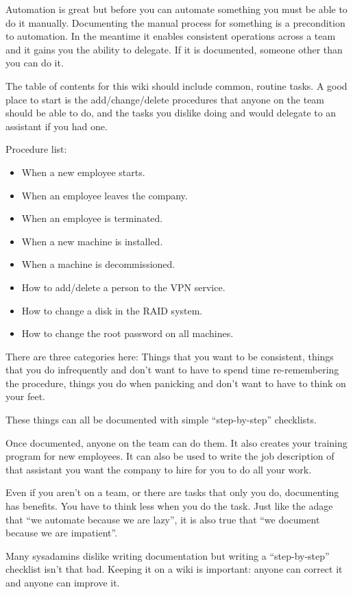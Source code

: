 \documentclass{article}
\begin{document}
Automation is great but before you can automate something you must be able to do it manually. Documenting the manual process for something is a precondition to automation. In the meantime it enables consistent operations across a team and it gains you the ability to delegate. If it is documented, someone other than you can do it.

The table of contents for this wiki should include common, routine tasks. A good place to start is the add/change/delete procedures that anyone on the team should be able to do, and the tasks you dislike doing and would delegate to an assistant if you had one.

Procedure list:

\begin{itemize}
    \item When a new employee starts.
    \item When an employee leaves the company.
    \item When an employee is terminated.
    \item When a new machine is installed.
    \item When a machine is decommissioned.
    \item How to add/delete a person to the VPN service.
    \item How to change a disk in the RAID system.
    \item How to change the root password on all machines.
\end{itemize}

There are three categories here: Things that you want to be consistent, things that you do infrequently and don't want to have to spend time re-remembering the procedure, things you do when panicking and don't want to have to think on your feet.

These things can all be documented with simple ``step-by-step'' checklists.

Once documented, anyone on the team can do them. It also creates your training program for new employees. It can also be used to write the job description of that assistant you want the company to hire for you to do all your work.

Even if you aren't on a team, or there are tasks that only you do, documenting has benefits. You have to think less when you do the task. Just like the adage that ``we automate because we are lazy'', it is also true that ``we document because we are impatient''.

Many sysadamins dislike writing documentation but writing a ``step-by-step'' checklist isn't that bad. Keeping it on a wiki is important: anyone can correct it and anyone can improve it.
\end{document}
